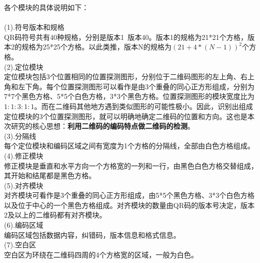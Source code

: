 各个模块的具体说明如下：\\ \\
(1).符号版本和规格\\
QR码符号共有40种规格，分别是版本1~版本40。版本1的规格为21*21个方格，版本2的规格为25*25个方格。以此类推，版本N的规格为$ (21+4*(N-1))^2 $个方格。\\
(2).定位模块\\
定位模块包括3个位置相同的位置探测图形，分别位于二维码图形的左上角、右上角和左下角。每个位置探测图形可以看作是由3个重叠的同心正方形组成，分别为7*7个黑色方格、5*5个白色方格，3*3个黑色方格。位置探测图形的模块宽度比为$ 1:1:3:1:1 $。而在二维码其他地方遇到类似图形的可能性极小。因此，识别出组成定位模块的3个位置探测图形，就可以明确地确定二维码的位置和方向。这也是本次研究的核心思想：\textbf{利用二维码的编码特点做二维码的检测}。\\
(3).分隔线\\
每个定位模块和编码区域之间有宽度为1个方格的分隔线，全部由白色方格组成。\\
(4).修正模块\\
修正模块是垂直和水平方向一个方格宽的一列和一行，由黑色白色方格交替组成，其开始和结尾都是黑色方格。\\
(5).对齐模块\\
对齐模块可看作是3个重叠的同心正方形组成，由5*5个黑色方格、3*3个白色方格以及位于中心的一个黑色方格组成。对齐模块的数量由QR码的版本号决定，版本2及以上的二维码都有对齐模块。\\
(6).编码区域\\
编码区域包括数据内容，纠错码，版本信息和格式信息。\\
(7).空白区\\
空白区为环绕在二维码四周的4个方格宽的区域，一般为白色。

